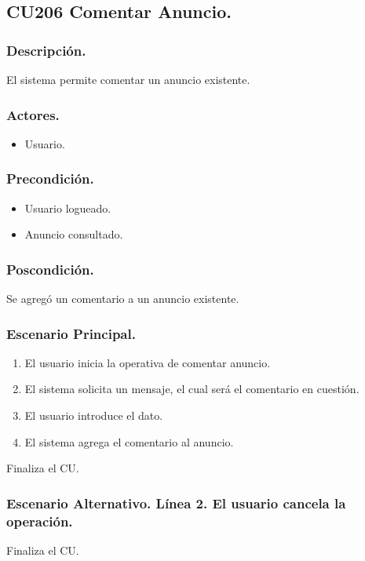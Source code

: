 \subsection{CU206 Comentar Anuncio.}
\subsubsection{Descripci\'{o}n.}
El sistema permite comentar un anuncio existente.
\subsubsection{Actores.}
\begin{itemize}
\item Usuario.
\end{itemize}
\subsubsection{Precondici\'{o}n.}
\begin{itemize}
\item Usuario logueado.
\item Anuncio consultado.
\end{itemize}
\subsubsection{Poscondici\'{o}n.}
Se agreg\'{o} un comentario a un anuncio existente.
\subsubsection{Escenario Principal.}
\begin{enumerate}
\item El usuario inicia la operativa de comentar anuncio.
\item El sistema solicita un mensaje, el cual ser\'{a} el comentario en cuesti\'{o}n.
\item El usuario introduce el dato.
\item El sistema agrega el comentario al anuncio.
\end{enumerate}
Finaliza el CU.
\subsubsection{Escenario Alternativo. L\'{i}nea 2. El usuario cancela la operaci\'{o}n.}
Finaliza el CU.
